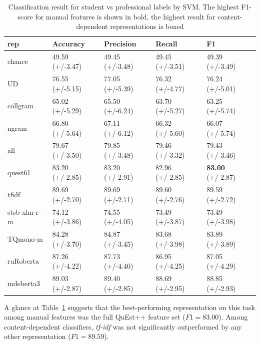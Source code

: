 \begin{table}[H]
	\centering
	\begin{tabular}{l|llll}
		\toprule
		rep   & Accuracy        & Precision       & Recall          & F1              \\
		\midrule
		chance          & 49.59 (+/-3.47) & 49.45 (+/-3.48) & 49.45 (+/-3.51) & 49.39 (+/-3.49) \\
		\midrule
		UD              & 76.55 (+/-5.15) & 77.05 (+/-5.39) & 76.32 (+/-4.77) & 76.24 (+/-5.01) \\
		collgram        & 65.02 (+/-5.29) & 65.50 (+/-6.24) & 63.70 (+/-5.27) & 63.25 (+/-5.74) \\
		ngram           & 66.80 (+/-5.64) & 67.11 (+/-6.12) & 66.32 (+/-5.60) & 66.07 (+/-5.74) \\
		all             & 79.67 (+/-3.50) & 79.85 (+/-3.48) & 79.46 (+/-3.32) & 79.43 (+/-3.46) \\
		quest61         & 83.20 (+/-2.85) & 83.20 (+/-2.91) & 82.96 (+/-2.85) & \textbf{83.00} (+/-2.87) \\
		\midrule
		tfidf           & 89.69 (+/-2.70) & 89.69 (+/-2.71) & 89.60 (+/-2.76) & \boxit{0.4in} 89.59 (+/-2.72) \\
		stsb-xlm-r-m          & 74.12 (+/-3.86) & 74.55 (+/-4.05) & 73.49 (+/-3.87) & 73.49 (+/-3.98) \\
		TQmono-m        & 84.28 (+/-3.70) & 84.87 (+/-3.45) & 83.68 (+/-3.98) & 83.89 (+/-3.89) \\
		ruRoberta & 87.26 (+/-4.22) & 87.73 (+/-4.40) & 86.95 (+/-4.25) & 87.05 (+/-4.29) \\
		mdeberta3  & 89.03 (+/-2.87) & 89.40 (+/-2.85) & 88.69 (+/-2.95) & 88.85 (+/-2.93)\\
		\bottomrule
	\end{tabular}
	\caption{\label{tab:stu-pro}Classification result for student vs professional labels by SVM. The highest F1-score for manual features is shown in bold, the highest result for content-dependent representations is boxed}
\end{table}

A glance at Table~\ref{tab:stu-pro} suggests that the best-performing representation on this task among manual features was the full QuEst++ feature set ($F1=83.00$). Among content-dependent classifiers, \textit{tf-idf} was not significantly outperformed by any other representation ($F1=89.59$). 

